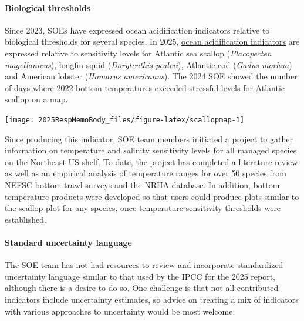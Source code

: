 \documentclass[
  10pt,
]{article}
\let\origfigure\figure
\let\endorigfigure\endfigure
\renewenvironment{figure}[1][2] {
    \expandafter\origfigure\expandafter[H]
} {
    \endorigfigure
}
\begin{document}
\paragraph{Biological thresholds}\label{biological-thresholds}

Since 2023, SOEs have expressed ocean acidification indicators relative
to biological thresholds for several species. In 2025,
\href{https://noaa-edab.github.io/catalog/ocean_acidification.html}{ocean
acidification indicators} are expressed relative to sensitivity levels
for Atlantic sea scallop (\emph{Placopecten magellanicus}), longfin
squid (\emph{Doryteuthis pealeii}), Atlantic cod (\emph{Gadus morhua})
and American lobster (\emph{Homarus americanus}). The 2024 SOE showed
the number of days where
\href{https://noaa-edab.github.io/catalog/observation_synthesis.html\#key-results-and-visualizations-60}{2022
bottom temperatures exceeded stressful levels for Atlantic scallop on a
map}.

\begin{figure}

{\centering \texttt{[image: 2025RespMemoBody\_files/figure-latex/scallopmap-1]} 

}

\caption{The number of days in 2022 where bottom temperature was between 17 and 19 ℃ (stressful thermal temperatures for sea scallops) in each GLORYS grid cell. The gray lines show the sea scallop estimation areas, with the Elephant Trunk region highlighted in black lines.}\label{fig:scallopmap}
\end{figure}

Since producing this indicator, SOE team members initiated a project to
gather information on temperature and salinity sensitivity levels for
all managed species on the Northeast US shelf. To date, the project has
completed a literature review as well as an empirical analysis of
temperature ranges for over 50 species from NEFSC bottom trawl surveys
and the NRHA database. In addition, bottom temperature products were
developed so that users could produce plots similar to the scallop plot
for any species, once temperature sensitivity thresholds were
established.

\paragraph{Standard uncertainty
language}\label{standard-uncertainty-language}

The SOE team has not had resources to review and incorporate
standardized uncertainty language similar to that used by the IPCC for
the 2025 report, although there is a desire to do so. One challenge is
that not all contributed indicators include uncertainty estimates, so
advice on treating a mix of indicators with various approaches to
uncertainty would be most welcome.
\end{document}
